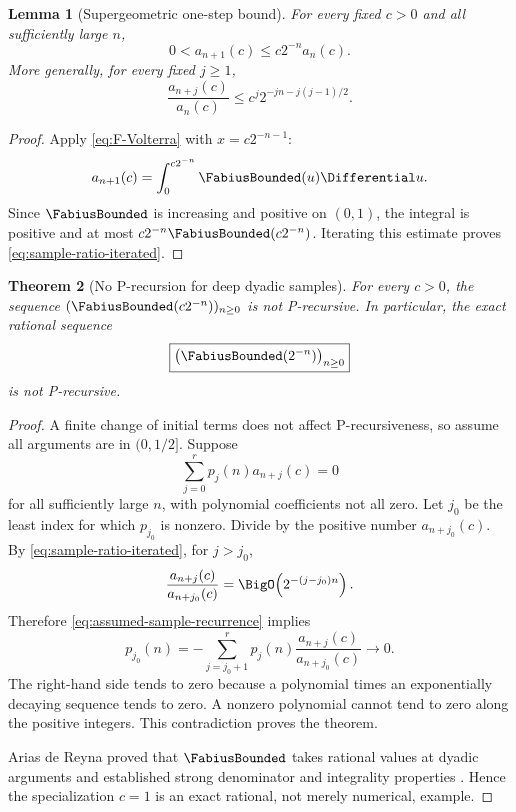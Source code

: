 \documentclass[11pt]{article}
\numberwithin{equation}{section}
\newtheorem{theorem}{Theorem}[section]
\newtheorem{lemma}[theorem]{Lemma}
\theoremstyle{definition}
\theoremstyle{remark}
\begin{document}
\begin{lemma}[Supergeometric one-step bound]
\label{lem:sample-ratio}
For every fixed $c>0$ and all sufficiently large $n$,
\begin{equation}
 0<a_{n+1}(c)\le c2^{-n}a_n(c).
 \label{eq:sample-ratio}
\end{equation}
More generally, for every fixed $j\ge1$,
\begin{equation}
 \frac{a_{n+j}(c)}{a_n(c)}
 \le c^j2^{-jn-j(j-1)/2}.
 \label{eq:sample-ratio-iterated}
\end{equation}
\end{lemma}
\begin{proof}
Apply \eqref{eq:F-Volterra} with $x=c2^{-n-1}$:
\[
 a_{n+1}(c)=\int_0^{c2^{-n}}\FabiusBounded(u)\Differential u.
\]
Since $\FabiusBounded$ is increasing and positive on $(0,1)$, the integral is positive and
at most $c2^{-n}\FabiusBounded(c2^{-n})$.  Iterating this estimate proves
\eqref{eq:sample-ratio-iterated}.
\end{proof}

\begin{theorem}[No P-recursion for deep dyadic samples]
\label{thm:deep-samples-not-P}
For every $c>0$, the sequence $(\FabiusBounded(c2^{-n}))_{n\ge0}$ is not P-recursive.  In
particular, the exact rational sequence
\begin{equation}
 \boxed{\bigl(\FabiusBounded(2^{-n})\bigr)_{n\ge0}}
 \label{eq:exact-dyadic-sequence}
\end{equation}
is not P-recursive.
\end{theorem}
\begin{proof}
A finite change of initial terms does not affect P-recursiveness, so assume all
arguments are in $(0,1/2]$.  Suppose
\begin{equation}
 \sum_{j=0}^{r}p_j(n)a_{n+j}(c)=0
 \label{eq:assumed-sample-recurrence}
\end{equation}
for all sufficiently large $n$, with polynomial coefficients not all zero.
Let $j_0$ be the least index for which $p_{j_0}$ is nonzero.  Divide by the
positive number $a_{n+j_0}(c)$.  By
\eqref{eq:sample-ratio-iterated}, for $j>j_0$,
\begin{equation}
 \frac{a_{n+j}(c)}{a_{n+j_0}(c)}
 =\BigO\!\left(2^{-(j-j_0)n}\right).
 \label{eq:later-samples-small}
\end{equation}
Therefore \eqref{eq:assumed-sample-recurrence} implies
\begin{equation}
 p_{j_0}(n)=
 -\sum_{j=j_0+1}^{r}p_j(n)
   \frac{a_{n+j}(c)}{a_{n+j_0}(c)}
 \longrightarrow0.
 \label{eq:polynomial-to-zero}
\end{equation}
The right-hand side tends to zero because a polynomial times an exponentially
decaying sequence tends to zero.  A nonzero polynomial cannot tend to zero
along the positive integers.  This contradiction proves the theorem.

Arias de Reyna proved that $\FabiusBounded$ takes rational values at dyadic arguments and
established strong denominator and integrality properties
\cite{AriasDefinition,AriasArithmetic}.  Hence the specialization $c=1$ is an
exact rational, not merely numerical, example.
\end{proof}
\end{document}
